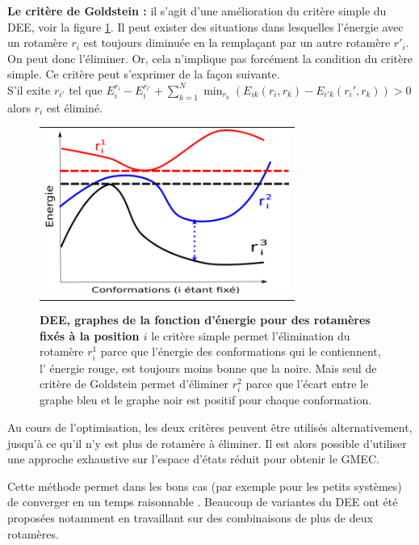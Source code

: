 \textbf{Le critère de Goldstein \cite{Goldstein94}:} il s'agit d'une amélioration du critère simple du DEE, voir la figure \ref{fig:DEE}. Il peut exister des situations dans lesquelles l'énergie avec un rotamère $r_i$  est toujours diminuée en la remplaçant par un autre rotamère $r'_i$. On peut donc l'éliminer. Or, cela n'implique pas forcément la condition du critère simple. Ce critère peut s'exprimer de la façon suivante.\\
S'il exite $r_{i'}$ tel que $E_i^{r_i} - E_i^{r_{i'}}+ \sum_{k=1}^N \min_{r_k} (E_{ik}(r_i,r_k) - E_{i'k}(r_i',r_k)) > 0$ alors $r_i$ est éliminé.

   \begin{figure}[!htbp]
     \centering
     \begin{tabular}{c}
       \includegraphics[width=8cm]{figure/DEE.png} &
     \end{tabular}
     
     \caption{\textbf{DEE, graphes de la fonction d'énergie pour des rotamères fixés à la position $i$} le critère simple permet l'élimination du rotamère $r^1_i$ parce que l'énergie des conformations qui le contiennent, l' énergie rouge, est toujours moins bonne que la noire. Mais seul de critère de Goldstein permet d'éliminer $r^2_i$ parce que l'écart entre le graphe bleu et le graphe noir est positif pour chaque conformation.}
\label{fig:DEE}
   \end{figure}

Au cours de l'optimisation, les deux critères peuvent être utilisés alternativement, jusqu'à ce qu'il n'y est plus de rotamère à éliminer. Il est alors possible d'utiliser une approche exhaustive sur l'espace d'états réduit pour obtenir le GMEC.

Cette méthode permet dans les bons cas (par exemple pour les petits systèmes) de converger en un temps raisonnable \cite{Leach98}. Beaucoup de variantes du DEE \cite{Pierce00,Lilien05} ont été proposées notamment en travaillant sur des combinaisons de plus de deux rotamères.


